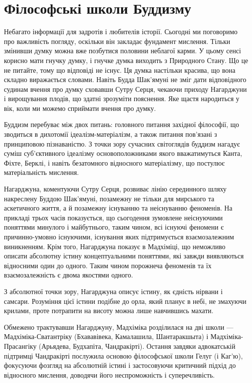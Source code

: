 \section{Філософські школи Буддизму}

Небагато інформації для задротів і любителів історії. Сьогодні
ми поговоримо про важливість погляду, оскільки він закладає фундамент мислення.
Тільки змінивши думку можна вже позбутися половини неблагої карми.
У цьому сенсі корисно мати гнучку думку, і гнучке думка виходить з
Природного Стану. Що це не питайте, тому що відповіді не існує.
Ця думка настільки красива, що вона складно виражається словами.
Навіть Будда Шак'ямуні не зміг дати відповідного судинам вчення про думку
сховавши Сутру Серця, чекаючи приходу Нагарджуни і вирощування плодів, що здатні зрозуміти пояснення.
Яке щастя народиться у вік, коли ми можемо сприймати вчення про думку.

Буддизм перебуває між двох питань: головного питання західної філософії,
що зводиться в дихотомії ідеалізм-матеріалізм, а також питання пов'язані
з принциповою пізнаваністю. З точки зору сучасних світоглядів буддизм
нагадує суміш суб'єктивного ідеалізму основоположниками якого вважатимуться
Канта, Фіхте, Берклі, і навіть безатомного відносного матеріалізму, що постулює матеріальність мислення.

Нагарджуна, коментуючи Сутру Серця, розвиває лінію серединного шляху
накреслену Буддою Шак'ямуні, позамежну не тільки для мирського та аскетичного життя,
а й позамежну існуванню та неіснуванню феноменів. На прикладі трьох часів
показується, що сьогодення зумовлене неіснуючими поняттями минулого і майбутнього,
таким чином, всі існуючі феномени є причинно-умовно існуючими, існування яких
підтримується взаємозалежним виникненням. Крім того, Нагарджуна показує в Мадхіміці,
що неможливо описати абсолютну істину концептуальними поняттями, які завжди
виявляються відносними один до одного. Таким чином порожнеча феноменів
та їх взаємозалежність є двома якостями одного.

З абсолютної точки зору, Нагарджуна описує істину, як єдність нірвани і самсари.
Розуміння цієї істини подібне до орла, який планує в небі, не змахуючи крилами,
проте потрапити на висоту можна лише навчившись махати.

Обмежено трактувавши Нагарджуну, Мадхіміка розділилася на дві школи ---
Мадхіміка-Сватантріку (Бхававівека, Камалашила, Шантаракшыта) і Мадхіміка-Прасангіку
(Арьядева, Будхапіта, Чандракірті). Остання завдяки адвокатській підтримці Чандракірті
послужила основою філософської школи Гелуг (і Каг'ю), фокусуючи фозгляд на абсолютній
істині і застосовуючи критичний підхід до відносного мислення, доводячи його неспроможність і суперечливість.


